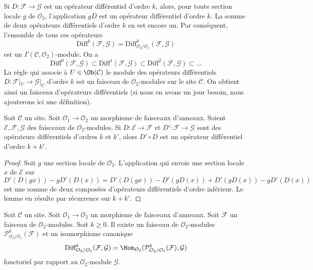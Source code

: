 \noindent
Si $D : \mathcal{F} \to \mathcal{G}$ est un opérateur différentiel d'ordre $k$,
alors, pour toute section locale $g$ de $\mathcal{O}_2$, l'application $gD$ est
un opérateur différentiel d'ordre $k$. La somme de deux opérateurs différentiels
d'ordre $k$ en est encore un. Par conséquent, l'ensemble de tous ces opérateurs
$$
\text{Diff}^k(\mathcal{F}, \mathcal{G}) =
\text{Diff}^k_{\mathcal{O}_2/\mathcal{O}_1}(\mathcal{F}, \mathcal{G})
$$
est un $\Gamma(\mathcal{C}, \mathcal{O}_2)$-module. On a
$$
\text{Diff}^0(\mathcal{F}, \mathcal{G}) \subset
\text{Diff}^1(\mathcal{F}, \mathcal{G}) \subset
\text{Diff}^2(\mathcal{F}, \mathcal{G}) \subset \ldots
$$
La règle qui associe à $U \in \Ob(\mathcal{C})$ le module des
opérateurs différentiels $D : \mathcal{F}|_U \to \mathcal{G}|_U$
d'ordre $k$ est un faisceau de $\mathcal{O}_2$-modules sur le site $\mathcal{C}$.
On obtient ainsi un faisceau d'opérateurs différentiels (si nous en avons un
jour besoin, nous ajouterons ici une définition).

\begin{lemma}
\label{lemma-composition-differential-operators}
Soit $\mathcal{C}$ un site.
Soit $\mathcal{O}_1 \to \mathcal{O}_2$ un morphisme de faisceaux d'anneaux.
Soient $\mathcal{E}, \mathcal{F}, \mathcal{G}$ des faisceaux de
$\mathcal{O}_2$-modules.
Si $D : \mathcal{E} \to \mathcal{F}$ et $D' : \mathcal{F} \to \mathcal{G}$
sont des opérateurs différentiels d'ordres $k$ et $k'$, alors $D' \circ D$ est
un opérateur différentiel d'ordre $k + k'$.
\end{lemma}

\begin{proof}
Soit $g$ une section locale de $\mathcal{O}_2$.
L'application qui envoie une section locale $x$ de $\mathcal{E}$ sur
$$
D'(D(gx)) - gD'(D(x)) = D'(D(gx)) - D'(gD(x)) + D'(gD(x)) - gD'(D(x))
$$
est une somme de deux composées d'opérateurs différentiels d'ordre inférieur.
Le lemme en résulte par récurrence sur $k + k'$.
\end{proof}

\begin{lemma}
\label{lemma-module-principal-parts}
Soit $\mathcal{C}$ un site.
Soit $\mathcal{O}_1 \to \mathcal{O}_2$ un morphisme de faisceaux d'anneaux.
Soit $\mathcal{F}$ un faisceau de $\mathcal{O}_2$-modules.
Soit $k \geq 0$. Il existe un faisceau de $\mathcal{O}_2$-modules
$\mathcal{P}^k_{\mathcal{O}_2/\mathcal{O}_1}(\mathcal{F})$
et un isomorphisme canonique
$$
\text{Diff}^k_{\mathcal{O}_2/\mathcal{O}_1}(\mathcal{F}, \mathcal{G}) =
\Hom_{\mathcal{O}_2}(
\mathcal{P}^k_{\mathcal{O}_2/\mathcal{O}_1}(\mathcal{F}), \mathcal{G})
$$
fonctoriel par rapport au $\mathcal{O}_2$-module $\mathcal{G}$.
\end{lemma}


